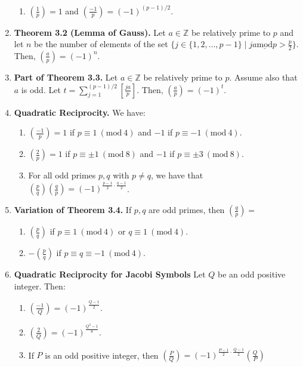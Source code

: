 \documentclass[11pt]{article}
\theoremstyle{definition}
\theoremstyle{named}
\newcommand{\Mod}[1]{\ (\mathrm{mod}\ #1)}
\begin{document}
\begin{enumerate}
\begin{enumerate}
        \item $\left(\frac{1}{p}\right) = 1$ and $\left(\frac{-1}{p}\right) = (-1)^{(p-1)/2}$. 
    \end{enumerate}
    \item \textbf{Theorem 3.2 (Lemma of Gauss). } Let $a \in \mathbb{Z}$ be relatively prime to $p$ and let $n$ be the number of elements of the set $\{j \in \{1,2,\dots,p-1\} \mid ja \underline{\textrm{mod}} p > \frac{p}{2}\}$. Then, $\left(\frac{a}{p}\right) = (-1)^n$. 
    \item \textbf{Part of Theorem 3.3. } Let $a \in \mathbb{Z}$ be relatively prime to $p$. Assume also that $a$ is odd. Let $t = \sum_{j=1}^{(p-1)/2} \left[\frac{ja}{p}\right]$. Then, $\left(\frac{a}{p}\right) = (-1)^t$. 
    \item \textbf{Quadratic Reciprocity. } We have: 
    \begin{enumerate}
        \item $\left(\frac{-1}{p}\right) = 1$ if $p \equiv 1 \Mod{4}$ and $-1$ if $p \equiv -1 \Mod{4}$. 
        \item $\left(\frac{2}{p}\right) = 1$ if $p \equiv \pm 1 \Mod{8}$ and $-1$ if $p \equiv \pm 3 \Mod{8}$. 
        \item For all odd primes $p,q$ with $p \neq q$, we have that $\left(\frac{p}{q}\right)\left(\frac{q}{p}\right) = (-1)^{\frac{p-1}{2} \cdot \frac{q-1}{2}}$. 
    \end{enumerate}
    \item \textbf{Variation of Theorem 3.4. } If $p,q$ are odd primes, then $\left(\frac{q}{p}\right) = $
    \begin{enumerate}
        \item $\left(\frac{p}{q}\right)$ if $p \equiv 1 \Mod{4}$ or $q \equiv 1 \Mod{4}$. 
        \item $-\left(\frac{p}{q}\right)$ if $p \equiv q \equiv -1 \Mod{4}$. 
    \end{enumerate}
    \item \textbf{Quadratic Reciprocity for Jacobi Symbols} Let $Q$ be an odd positive integer. Then: 
    \begin{enumerate}
        \item $\left(\frac{-1}{Q}\right) = (-1)^{\frac{Q-1}{2}}$. 
        \item $\left(\frac{2}{Q}\right) = (-1)^{\frac{Q^2 - 1}{8}}$. 
        \item If $P$ is an odd positive integer, then $\left(\frac{P}{Q}\right) = (-1)^{\frac{P-1}{2} \cdot \frac{Q-1}{2}}\left(\frac{Q}{P}\right)$

\end{enumerate}
\end{enumerate}
\end{document}
